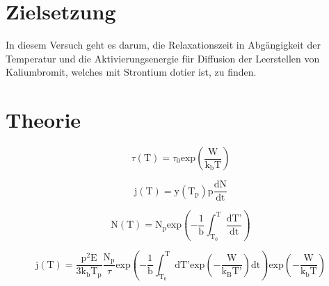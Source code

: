 \section{Zielsetzung}
In diesem Versuch geht es darum, die Relaxationszeit in Abgängigkeit der Temperatur und die Aktivierungsenergie für Diffusion der Leerstellen
von Kaliumbromit, welches mit Strontium dotier ist, zu finden. 

\section{Theorie}


\begin{equation}
\tau \left( \text{T} \right) = \tau_0  \text{exp} \left(\frac{\text{W}}{\text{k}_{\text{b}}\text{T}}\right) 
\label{eqn:relaxo}
\end{equation}

\begin{equation}
\text{j} \left( \text{T} \right) = \text{y} \left( \text{T}_{\text{p}}\right) \text{p} \frac{\text{dN}}{\text{dt}}
\label{eqn:dichte}
\end{equation}

\begin{equation}
\text{N}\left( \text{T} \right) = \text{N}_{\text{p}} \text{exp} \left( - \frac{1}{\text{b}} \int^{\text{T}}_{\text{T}_0} \frac{\text{dT'}}{\text{dt}}\right)
\label{eqn:orientierung}
\end{equation}

\begin{equation}
\text{j} \left( \text{T} \right) = \frac{\text{p}^2 \text{E}}{3\text{k}_{\text{b}}\text{T}_{\text{p}}} \frac{\text{N}_{\text{p}}}{\tau} \text{exp} \left( -\frac{1}{\text{b}} \int^{\text{T}}_{\text{T}_0} \text{dT'} \text{exp} \left( - \frac{\text{W}}{\text{k}_{\text{B}}\text{T'}} \right) \text{dt} \right) \text{exp} \left(-\frac{\text{W}}{\text{k}_{\text{b}}\text{T}} \right)
\label{killme}
\end{equation}

\begin{equation}
\end{equation}

\begin{equation}
\end{equation}

\begin{equation}
\end{equation}